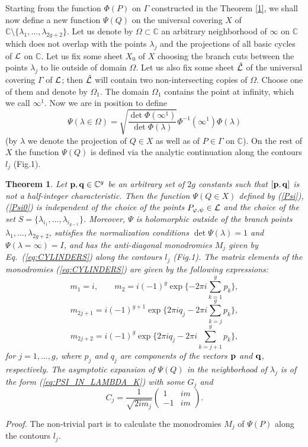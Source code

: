 \documentclass[11pt]{article}
\newtheorem{theorem}{Theorem}[section]
\def\be{\begin{equation}}
\def\ee{\end{equation}}
\def\ben{\begin{displaymath}}
\def\een{\end{displaymath}}
\def\ba{\begin{array}}
\def\ea{\end{array}}
\def\l{\lambda}
\def\phi{\varphi}
\def\C{\mathbb{C}}
\def\la{\label}
\def\f{\frac}
\def\L{{\cal L}}
\def\pb{{\bf p}}
\def\qb{{\bf q}}
\begin{document}
Starting from the function $\Phi(P)$ on $\Gamma$ constructed in the Theorem 
\ref{1}, we shall now define a new function $\Psi(Q)$ on the universal covering $X$ of $\C\setminus\{\l_1,\dots,\l_{2g+2}\}$. 
Let us denote by $\Omega\subset\C$ an arbitrary neighborhood of $\infty$ on $\C$ which does not overlap with the points $\l_j$ and the projections of all basic cycles of $\L$ on $\C$. Let us fix some sheet $X_0$ of $X$ choosing the branch cuts between the
points $\l_j$ to lie outside of domain $\Omega$. Let us also fix some sheet $\hat{\L}$ of the universal covering $\Gamma$ of $\L$; then $\hat{\L}$ will contain two non-intersecting copies of $\Omega$. Choose one of them and denote by $\Omega_1$. The domain 
$\Omega_1$ contains the point at infinity, which we call $\infty^1$. Now we are in position to define 
\be
\Psi(\l\in\Omega)=\sqrt{\f{\det \Phi(\infty^1)}{\det \Phi(\l)}}\Phi^{-1}(\infty^1)\Phi(\l)
\la{Psi}\ee
(by $\lambda$ we denote the projection of $Q\in X$ as well as of $P\in \Gamma$ on $\C$). On the rest of $X$ the function $\Psi(Q)$ is defined via the analytic continuation along the contours $l_j$ (Fig.1). 
\begin{theorem}
Let $\pb,\qb\in\C^g$ be an arbitrary set of $2g$ constants such that
$[\pb,\qb]$ is not a half-integer characteristic. Then the function $\Psi(Q\in X)$ defined by {\rm (\ref{Psi}), (\ref{Psi0})} is independent of the choice of the points $P_{\phi,\psi}\in\L$ and the choice of the set $S=\{\l_{i_1},\dots,\l_{i_{g-1}}\}$. Moreover, $\Psi$ is holomorphic outside of the branch points $\l_1,\dots,\l_{2g+2}$, satisfies the normalization conditions $\det\Psi(\l)=1$ and $\Psi(\l=\infty)=I$, and has the anti-diagonal monodromies $M_j$ given by {\rm Eq.~(\ref{eq:CYLINDERS})} 
along the contours $l_j$ 
{\rm (Fig.1)}. The matrix elements of the monodromies {\rm (\ref{eq:CYLINDERS})} are given by the following expressions:
\ben
m_1=i,\;\;\;\;\;\;\;
m_2=i (-1)^{g}\exp\{-2\pi i \sum_{k=1}^g p_k\},
\een
\ben
m_{2j+1}= i (-1)^{g+1}\exp\{2\pi i q_j- 2\pi i \sum_{k=j}^g p_k\},
\een
\be
m_{2j+2}= i(-1)^{g}\exp\{2\pi i q_j-2\pi i \sum_{k=j+1}^g p_k\},
\la{mj}\ee
\la{main}
for $j=1,\dots,g$, where $p_j$ and $q_j$  are components of the 
vectors $\pb$ and $\qb$, respectively.
The asymptotic expansion of $\Psi(Q)$ in the neighborhood of $\l_j$ is of the form {\rm (\ref{eq:PSI_IN_LAMBDA_K})} with some $G_j$ and 
\be
C_j=\f{1}{\sqrt{2i m_j}}\left(\ba{cc} 1 & im \\ -1 & im\ea\right).
\la{Cj}\ee
\la{thPsi}
\end{theorem}
{\it Proof.}
The non-trivial part is to calculate the monodromies $M_j$ of $\Psi(P)$ along the contours $l_j$.
\end{document}
